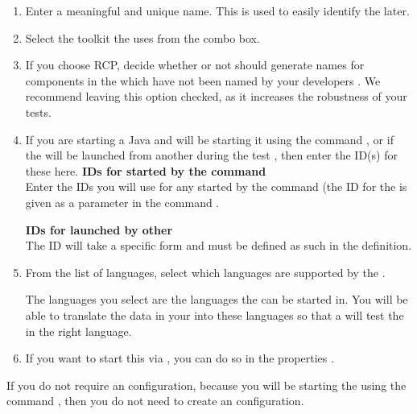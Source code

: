 \begin{enumerate}
\item Enter a meaningful and unique \gdaut{} name. This is used to easily identify the \gdaut{} later. 
\item Select the toolkit the \gdaut{} uses from the combo box. 
\item If you choose RCP, decide whether or not \app{} should generate names for components in the \gdaut{} which have not been named by your developers . We recommend leaving this option checked, as it increases the robustness of your tests. 
\item If you are starting a Java \gdaut{} and  will be starting it using the  command , or if the \gdaut{} will be launched from another \gdaut{} during the test , then enter the ID(s) for these \gdauts{} here. 
\textbf{IDs for \gdauts{} started by the  command}\\
Enter the \gdaut{} IDs you will use for any \gdauts{} started by the  command (the \gdaut{} ID for the \gdaut{} is given as a parameter in the  command .

\textbf{IDs for \gdauts{} launched by other \gdauts{}}\\
The \gdaut{} ID will take a specific form  and must be defined as such in the \gdaut{} definition.
 
\item From the list of \gdproject{} languages, select which languages are supported by the \gdaut{}. 

The languages you select are the languages the \gdaut{} can be started in.  You will be able to translate the data in your \gdcases{} into these languages so that a \gdsuite{} will test the \gdaut{} in the right language. 


\item If you want to start this \gdaut{} via \app{}, you can do so in the \gdproject{} properties .
\end{enumerate}

If you do not require an \gdaut{} configuration, because you will be starting the \gdaut{} using the  command , then you do not need to create an \gdaut{} configuration. 

\clearpage
